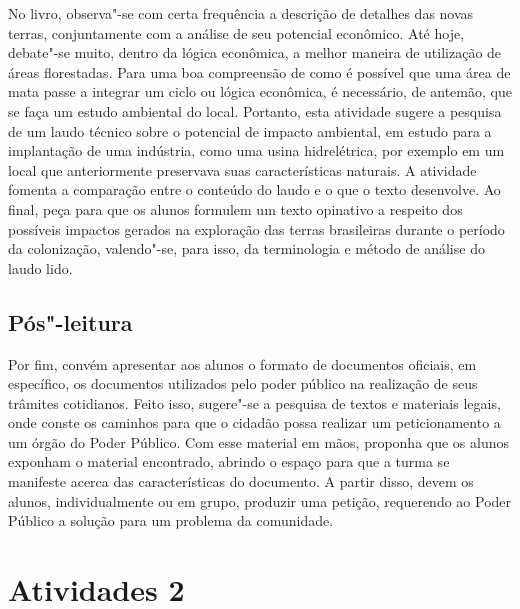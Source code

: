 \documentclass[12pt]{extarticle}
\begin{document}

No livro, observa"-se com certa frequência a descrição de detalhes das
novas terras, conjuntamente com a análise de seu potencial econômico.
Até hoje, debate"-se muito, dentro da lógica econômica, a melhor maneira
de utilização de áreas florestadas. Para uma boa compreensão de como é
possível que uma área de mata passe a integrar um ciclo ou lógica
econômica, é necessário, de antemão, que se faça um estudo ambiental do
local. Portanto, esta atividade sugere a pesquisa de um laudo técnico
sobre o potencial de impacto ambiental, em estudo para a implantação de
uma indústria, como uma usina hidrelétrica, por exemplo em um local que
anteriormente preservava suas características naturais. A atividade
fomenta a comparação entre o conteúdo do laudo e o que o texto
desenvolve. Ao final, peça para que os alunos formulem um texto
opinativo a respeito dos possíveis impactos gerados na exploração das
terras brasileiras durante o período da colonização, valendo"-se, para
isso, da terminologia e método de análise do laudo lido.


\subsection{Pós"-leitura}


Por fim, convém apresentar aos alunos o formato de
documentos oficiais, em específico, os documentos utilizados pelo poder
público na realização de seus trâmites cotidianos. Feito isso, sugere"-se
a pesquisa de textos e materiais legais, onde conste os caminhos para
que o cidadão possa realizar um peticionamento a um órgão do Poder
Público. Com esse material em mãos, proponha que os alunos exponham o
material encontrado, abrindo o espaço para que a turma se manifeste
acerca das características do documento. A partir disso, devem os
alunos, individualmente ou em grupo, produzir uma petição, requerendo ao
Poder Público a solução para um problema da comunidade.

\section{Atividades 2}
\end{document}
